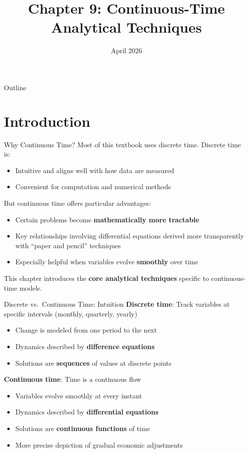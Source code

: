 \documentclass[blue]{beamer}
\title[Chapter9]{Chapter 9: Continuous-Time Analytical Techniques}
\author[]{}
\date[April 2026]{April 2026}
\begin{document}
  \frame
  {
    \titlepage
  }


\begin{frame}{Outline}
	\tableofcontents
\end{frame}

\section{Introduction}

\begin{frame}{Why Continuous Time?}
	Most of this textbook uses discrete time. Discrete time is:
	\begin{itemize}
		\item Intuitive and aligns well with how data are measured
		\item Convenient for computation and numerical methods 
	\end{itemize}
	
	\bigskip
	But continuous time offers particular advantages:
	\begin{itemize}
		\item Certain problems become \textbf{mathematically more tractable}
		\item Key relationships involving differential equations derived more transparently with ``paper and pencil'' techniques
		\item Especially helpful when variables evolve \textbf{smoothly} over time
	\end{itemize}
	
	\bigskip
	This chapter introduces the \textbf{core analytical techniques} specific to continuous-time models.
\end{frame}

\begin{frame}{Discrete vs.\ Continuous Time: Intuition}
	\textbf{Discrete time}: Track variables at specific intervals (monthly, quarterly, yearly)
	\begin{itemize}
		\item Change is modeled from one period to the next
		\item Dynamics described by \textbf{difference equations}
		\item Solutions are \textbf{sequences} of values at discrete points
	\end{itemize}
	
	\bigskip
	\textbf{Continuous time}: Time is a continuous flow
	\begin{itemize}
		\item Variables evolve smoothly at every instant
		\item Dynamics described by \textbf{differential equations}
		\item Solutions are \textbf{continuous functions} of time
		\item More precise depiction of gradual economic adjustments
	\end{itemize}
\end{frame}
\end{document}
